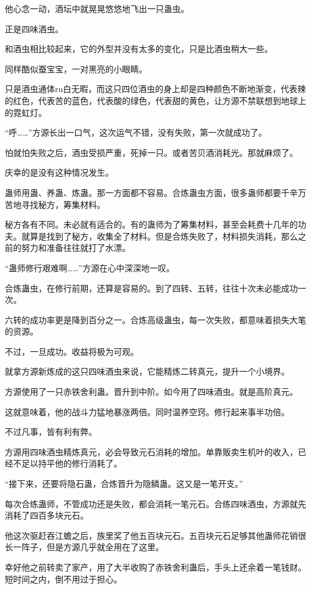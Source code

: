 \begin{this_body}
他心念一动，酒坛中就晃晃悠悠地飞出一只蛊虫。

正是四味酒虫。

和酒虫相比较起来，它的外型并没有太多的变化，只是比酒虫稍大一些。

同样酷似蚕宝宝，一对黑亮的小眼睛。

只是酒虫通体ru白无暇，而这只四位酒虫的身上却是四种颜色不断地渐变，代表辣的红色，代表苦的蓝色，代表酸的绿色，代表甜的黄色，让方源不禁联想到地球上的霓虹灯。

“呼……”方源长出一口气，这次运气不错，没有失败，第一次就成功了。

怕就怕失败之后，酒虫受损严重，死掉一只。或者苦贝酒消耗光。那就麻烦了。

庆幸的是没有这种情况发生。

蛊师用蛊、养蛊、炼蛊。那一方面都不容易。合炼蛊虫方面，很多蛊师都要千辛万苦地寻找秘方，筹集材料。

秘方各有不同。未必就有适合的。有的蛊师为了筹集材料，甚至会耗费十几年的功夫。就算是找到了秘方，收集全了材料。但是合炼失败了，材料损失消耗，那么之前的努力和准备往往就打了水漂。

“蛊师修行艰难啊……”方源在心中深深地一叹。

合炼蛊虫，在修行前期，还算是容易的。到了四转、五转，往往十次未必能成功一次。

六转的成功率更是降到百分之一。合炼高级蛊虫，每一次失败，都意味着损失大笔的资源。

不过，一旦成功。收益将极为可观。

就拿方源新炼成的这只四味酒虫来说，它能精炼二转真元，提升一个小境界。

方源使用了一只赤铁舍利蛊。晋升到中阶。如今用了四味酒虫。就是高阶真元。

这就意味着，他的战斗力猛地暴涨两倍。同时温养空窍。修行起来事半功倍。

不过凡事，皆有利有弊。

方源用四味酒虫精炼真元，必会导致元石消耗的增加。单靠贩卖生机叶的收入，已经不足以持平他的修行消耗了。

“接下来，还要将隐石蛊，合炼晋升为隐鳞蛊。这又是一笔开支。”

每次合练蛊师，不管成功还是失败，都会消耗一笔元石。合练四味酒虫，方源就先消耗了四百多块元石。

他这次驱赶吞江蟾之后，族里奖了他五百块元石。五百块元石足够其他蛊师花销很长一阵子，但是方源几乎就全用在了这里。

幸好他之前转卖了家产，用了大半收购了赤铁舍利蛊后，手头上还余着一笔钱财。短时间之内，倒不用过于担心。


\end{this_body}
